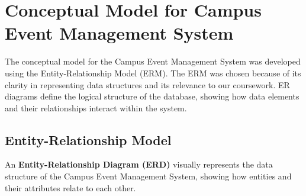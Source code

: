 


\section{Conceptual Model for Campus Event Management System}

The conceptual model for the Campus Event Management System was developed using the Entity-Relationship Model (ERM). The ERM was chosen because of its clarity in representing data structures and its relevance to our coursework. ER diagrams define the logical structure of the database, showing how data elements and their relationships interact within the system.

\subsection{Entity-Relationship Model}

An \textbf{Entity-Relationship Diagram (ERD)} visually represents the data structure of the Campus Event Management System, showing how entities and their attributes relate to each other.


